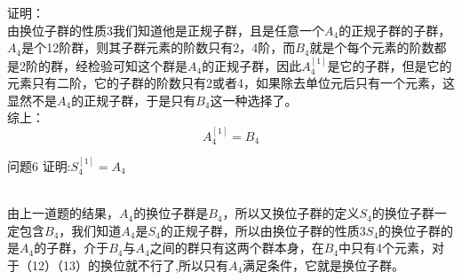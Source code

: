 \documentclass[utf8]{ctexart}
\begin{document}
\noindent
证明：\\
由换位子群的性质3我们知道他是正规子群，且是任意一个$A_{4}$的正规子群的子群，$A_{4}$是个12阶群，则其子群元素的阶数只有2，4阶，而$B_{4}$就是个每个元素的阶数都是2阶的群，经检验可知这个群是$A_{4}$的正规子群，因此$A_{4}^{[1]}$是它的子群，但是它的元素只有二阶，它的子群的阶数只有2或者4，如果除去单位元后只有一个元素，这显然不是$A_{4}$的正规子群，于是只有$B_{4}$这一种选择了。\\
综上：$$ A_{4}^{[1]}=B_{4} $$
\begin{mybox}[colback=white]{问题6}
证明:$ S_{4}^{[1]}=A_{4} $
\end{mybox}
\noindent\\
由上一道题的结果，$A_{4}$的换位子群是$B_{4}$，所以又换位子群的定义$S_{4}$的换位子群一定包含$B_{4}$，我们知道$A_{4}$是$S_{4}$的正规子群，所以由换位子群的性质3$S_{4}$的换位子群的是$A_{4}$的子群，介于$B_{4}$与$A_{4}$之间的群只有这两个群本身，在$B_{4}$中只有4个元素，对于（12）（13）的换位就不行了,所以只有$A_{4}$满足条件，它就是换位子群。
\end{document}
